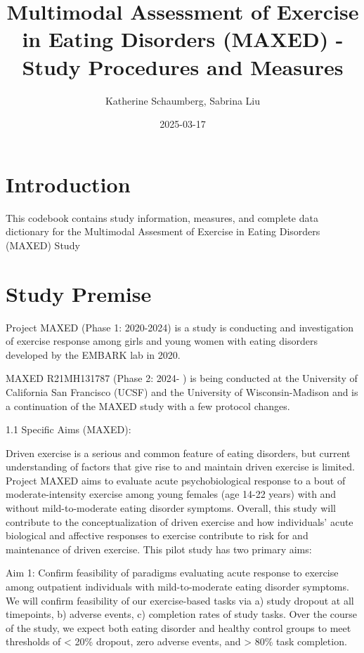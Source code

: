\documentclass[
]{book}
\title{Multimodal Assessment of Exercise in Eating Disorders (MAXED) - Study Procedures and Measures}
\author{Katherine Schaumberg, Sabrina Liu}
\date{2025-03-17}
\begin{document}
\maketitle

{
\setcounter{tocdepth}{1}
\tableofcontents
}
\chapter{Introduction}\label{introduction}

This codebook contains study information, measures, and complete data dictionary for the Multimodal Assesment of Exercise in Eating Disorders (MAXED) Study

\chapter{Study Premise}\label{study-premise}

Project MAXED (Phase 1: 2020-2024) is a study is conducting and investigation of exercise response among girls and young women with eating disorders developed by the EMBARK lab in 2020.

MAXED R21MH131787 (Phase 2: 2024- ) is being conducted at the University of California San Francisco (UCSF) and the University of Wisconsin-Madison and is a continuation of the MAXED study with a few protocol changes.

1.1 Specific Aims (MAXED):

Driven exercise is a serious and common feature of eating disorders, but current understanding of factors that give rise to and maintain driven exercise is limited.
Project MAXED aims to evaluate acute psychobiological response to a bout of moderate-intensity exercise among young females (age 14-22 years) with and without mild-to-moderate eating disorder symptoms.
Overall, this study will contribute to the conceptualization of driven exercise and how individuals' acute biological and affective responses to exercise contribute to risk for and maintenance of driven exercise.
This pilot study has two primary aims:

Aim 1: Confirm feasibility of paradigms evaluating acute response to exercise among outpatient individuals with mild-to-moderate eating disorder symptoms.
We will confirm feasibility of our exercise-based tasks via a) study dropout at all timepoints, b) adverse events, c) completion rates of study tasks.
Over the course of the study, we expect both eating disorder and healthy control groups to meet thresholds of \textless{} 20\% dropout, zero adverse events, and \textgreater{} 80\% task completion.
\end{document}
